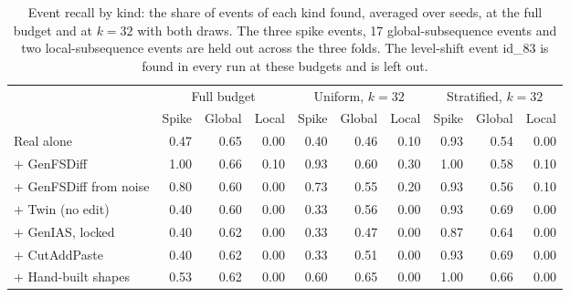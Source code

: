 \documentclass[11pt,a4paper]{article}
\begin{document}
\begin{table}[t]
\centering
\caption{Event recall by kind: the share of events of each kind found,
averaged over seeds, at the full budget and at $k = 32$ with both draws. The
three spike events, 17 global-subsequence events and two local-subsequence
events are held out across the three folds. The level-shift event id\_83 is
found in every run at these budgets and is left out.}
\label{tab:kindrec}
\footnotesize
\setlength{\tabcolsep}{3.6pt}
\begin{tabular}{@{}lrrrrrrrrr@{}}
\toprule
 & \multicolumn{3}{c}{Full budget} & \multicolumn{3}{c}{Uniform, $k = 32$}
 & \multicolumn{3}{c}{Stratified, $k = 32$} \\
\cmidrule(lr){2-4}\cmidrule(lr){5-7}\cmidrule(lr){8-10}
 & Spike & Global & Local & Spike & Global & Local & Spike & Global & Local \\
\midrule
Real alone & 0.47 & 0.65 & 0.00 & 0.40 & 0.46 & 0.10 & 0.93 & 0.54 & 0.00 \\
$+$ GenFSDiff & 1.00 & 0.66 & 0.10 & 0.93 & 0.60 & 0.30 & 1.00 & 0.58 & 0.10 \\
$+$ GenFSDiff from noise & 0.80 & 0.60 & 0.00 & 0.73 & 0.55 & 0.20 & 0.93 & 0.56 & 0.10 \\
$+$ Twin (no edit) & 0.40 & 0.60 & 0.00 & 0.33 & 0.56 & 0.00 & 0.93 & 0.69 & 0.00 \\
$+$ GenIAS, locked & 0.40 & 0.62 & 0.00 & 0.33 & 0.47 & 0.00 & 0.87 & 0.64 & 0.00 \\
$+$ CutAddPaste & 0.40 & 0.62 & 0.00 & 0.33 & 0.51 & 0.00 & 0.93 & 0.69 & 0.00 \\
$+$ Hand-built shapes & 0.53 & 0.62 & 0.00 & 0.60 & 0.65 & 0.00 & 1.00 & 0.66 & 0.00 \\
\bottomrule
\end{tabular}
\end{table}
\end{document}
